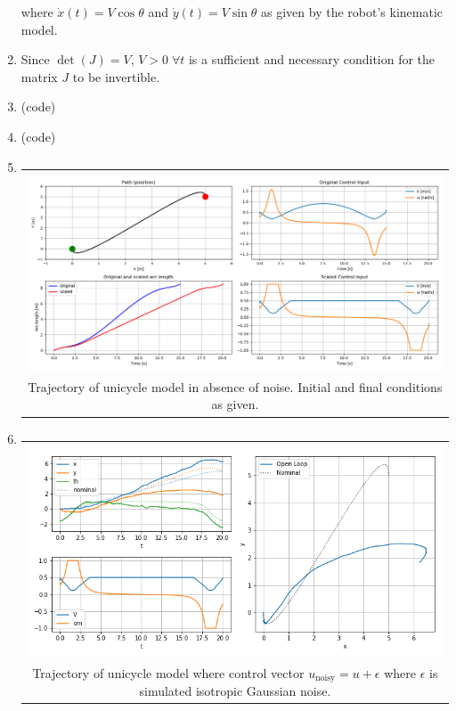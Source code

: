 \documentclass{article}
\begin{document}
\begin{enumerate}[label=(\roman*)]
where $\dot{x}(t)=V\cos\theta$ and $\dot{y}(t)=V\sin\theta$ as given by the robot's kinematic model.


\item %
Since $\det(J)=V$, $V>0\; \forall t$ is a sufficient and necessary condition for the matrix $J$ to be invertible.

\item %
(code)

\item %
(code)

\item %
\begin{tabular}[t]{c}
	\hline \\
	\includegraphics[width=1.0\textwidth]{img/differential_flatness.png} \\
	Trajectory of unicycle model in absence of noise. Initial and final conditions as given. \\
	\hline
\end{tabular}

\item %
\begin{tabular}[t]{c}
	\hline \\
	\includegraphics[width=1.0\textwidth]{img/sim_traj_openloop.png} \\
	Trajectory of unicycle model where control vector $u_\text{noisy}=u + \epsilon$ where $\epsilon$ is simulated isotropic Gaussian noise. \\
	\hline
\end{tabular}


\end{enumerate}
\end{document}
